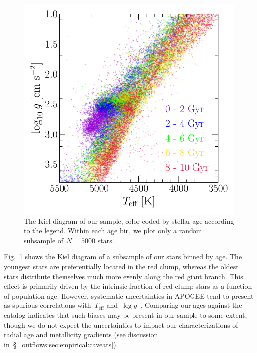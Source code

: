 \begin{figure}
\centering
\includegraphics[scale = 0.6]{kiel_diagram.pdf}
\caption{
The Kiel diagram of our sample, color-coded by stellar age according to the
legend.
Within each age bin, we plot only a random subsample of~$N = 5000$ stars.
}
\label{outflows:fig:kiel-diagram}
\end{figure}

Fig.~\ref{outflows:fig:kiel-diagram} shows the Kiel diagram of a subsample of
our stars binned by age.
The youngest stars are preferentially located in the red clump, whereas the
oldest stars distribute themselves much more evenly along the red giant branch.
This effect is primarily driven by the intrinsic fraction of red clump stars as
a function of population age.
However, systematic uncertainties in APOGEE tend to present as spurious
correlations with~$T_\text{eff}$ and~$\log g$~\citep[e.g.,][]{Joensson2018,
Eilers2022}.
Comparing our ages against the~\citet{Leung2023} catalog indicates that such
biases may be present in our sample to some extent, though we do not expect
the uncertainties to impact our characterizations of radial age and metallicity
gradients (see discussion in~\S~\ref{outflows:sec:empirical:caveats}).

